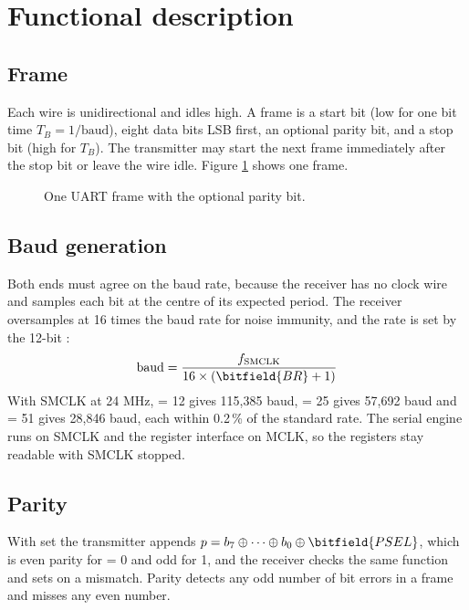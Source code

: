 \section{Functional description}

\subsection{Frame}

Each wire is unidirectional and idles high. A frame is a start bit (low for one bit time $T_B = 1/\textrm{baud}$), eight data bits LSB first, an optional parity bit, and a stop bit (high for $T_B$). The transmitter may start the next frame immediately after the stop bit or leave the wire idle. Figure \ref{fig:uart-timing-diagram} shows one frame.

\begin{figure}[htpb]
	
	\caption{One UART frame with the optional parity bit.}
	\label{fig:uart-timing-diagram}
\end{figure}

\subsection{Baud generation}

Both ends must agree on the baud rate, because the receiver has no clock wire and samples each bit at the centre of its expected period. The receiver oversamples at 16 times the baud rate for noise immunity, and the rate is set by the 12-bit :
\begin{equation*}
\textrm{baud} = \frac{f_\textrm{SMCLK}}{16 \times (\bitfield{BR} + 1)}
\end{equation*}
With SMCLK at 24 MHz,  = 12 gives 115,385 baud,  = 25 gives 57,692 baud and  = 51 gives 28,846 baud, each within 0.2\,\% of the standard rate. The serial engine runs on SMCLK and the register interface on MCLK, so the registers stay readable with SMCLK stopped.

\subsection{Parity}

With  set the transmitter appends $p = b_7 \oplus \cdots \oplus b_0 \oplus \bitfield{PSEL}$, which is even parity for  = 0 and odd for 1, and the receiver checks the same function and sets  on a mismatch. Parity detects any odd number of bit errors in a frame and misses any even number.

